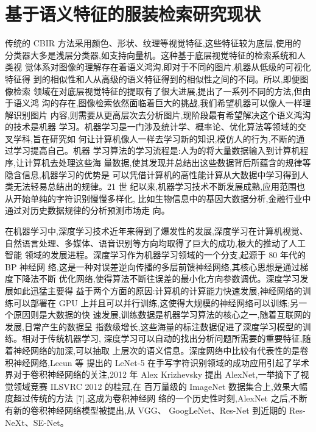 \section{基于语义特征的服装检索研究现状}
传统的 CBIR 方法采用颜色、形状、纹理等视觉特征,这些特征较为底层,使用的
分类器大多是浅层分类器,如支持向量机。这种基于底层视觉特征的检索系统和人类视
觉体系对图像的理解存在着语义鸿沟,即对于不同的图片,机器从低级的可视化特征得
到的相似性和人从高级的语义特征得到的相似性之间的不同\cite{卢兴敬2008基于内容的服装图像检索技术研究及实现}。所以,即便图像检索
领域在对底层视觉特征的提取有了很大进展,提出了一系列不同的方法,但由于语义鸿
沟的存在,图像检索依然面临着巨大的挑战,我们希望机器可以像人一样理解识别图片
内容,则需要从更高层次去分析图片,现阶段最有希望解决这个语义鸿沟的技术是机器
学习。机器学习是一门涉及统计学、概率论、优化算法等领域的交叉学科,旨在研究如
何让计算机像人一样去学习新的知识,模仿人的行为,不断的通过学习提高自己。机器
学习算法的学习流程是:人为的将大量数据输入到计算机程序,让计算机去处理这些海
量数据,使其发现并总结出这些数据背后所蕴含的规律等隐含信息,机器学习的优势是
可以凭借计算机的高性能计算从大数据中学习得到人类无法轻易总结出的规律。21 世
纪以来,机器学习技术不断发展成熟,应用范围也从开始单纯的字符识别慢慢多样化,
比如生物信息中的基因大数据分析,金融行业中通过对历史数据规律的分析预测市场走
向。

在机器学习中,深度学习技术近年来得到了爆发性的发展,深度学习在计算机视觉、
自然语言处理、多媒体、语音识别等方向均取得了巨大的成功,极大的推动了人工智能
领域的发展进程。深度学习作为机器学习领域的一个分支,起源于 80 年代的 BP \cite{rumelhart1988learning}神经网
络,这是一种对误差逆向传播的多层前馈神经网络,其核心思想是通过梯度下降法不断
优化网络,使得算法不断往误差的最小化方向参数调优。深度学习发展如此迅猛主要得
益于两个方面的原因:计算机的计算能力快速发展,神经网络的训练可以部署在 GPU
上并且可以并行训练,这使得大规模的神经网络可以训练;另一个原因则是大数据的快
速发展,训练数据是机器学习算法的核心之一,随着互联网的发展,日常产生的数据呈
指数级增长,这些海量的标注数据促进了深度学习模型的训练。相对于传统机器学习,
深度学习可以自动的找出分析问题所需要的重要特征,随着神经网络的加深,可以抽取
上层次的语义信息。深度网络中比较有代表性的是卷积神经网络,Lecun 等 提出的
LeNet-5\cite{lecun1998gradient} 在手写字符识别领域的成功应用引起了学术界对于卷积神经网络的关注,2012
年 Alex Krizhevsky 提出 AlexNet\cite{krizhevsky2012imagenet},一举摘下了视觉领域竞赛 ILSVRC 2012 的桂冠,在
百万量级的 ImageNet\cite{deng2009imagenet} 数据集合上,效果大幅度超过传统的方法 [7],这成为卷积神经网
络的一个历史性时刻,AlexNet 之后,不断有新的卷积神经网络模型被提出,从 VGG\cite{simonyan2014very}、
GoogLeNet\cite{szegedy2015going}、Res-Net\cite{he2016deep} 到近期的 Res-NeXt\cite{xie2017aggregated}、SE-Net\cite{hu2018squeeze}。


